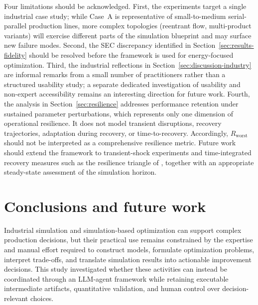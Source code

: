 \documentclass[a4paper,fleqn]{cas-sc}
\begin{document}
  Four limitations should be acknowledged. First, the experiments target a single industrial case study; while Case~A is
   representative of small-to-medium serial-parallel production lines, more complex topologies (reentrant flow,
  multi-product variants) will exercise different parts of the simulation blueprint and may surface new failure modes.  
  Second, the SEC discrepancy identified in Section~\ref{sec:results-fidelity} should be resolved before the framework
  is used for energy-focused optimization. Third, the industrial reflections in Section~\ref{sec:discussion-industry}
  are informal remarks from a small number of practitioners rather than a structured usability study; a separate
  dedicated investigation of usability and non-expert accessibility remains an interesting direction for future work.
  Fourth, the analysis in Section~\ref{sec:resilience} addresses performance retention under sustained parameter perturbations, which represents only one dimension of operational resilience. It does not model transient disruptions, recovery trajectories, adaptation during recovery, or time-to-recovery. Accordingly, $R_\mathrm{worst}$ should not be interpreted as a comprehensive resilience metric. Future work should extend the framework to transient-shock experiments and time-integrated recovery measures such as the resilience triangle of \citet{Bruneau2003}, together with an appropriate steady-state assessment of the simulation horizon.

     
  \section{Conclusions and future work}\label{sec:conclusion}

    Industrial simulation and simulation-based optimization can support complex production decisions, but their practical use remains constrained by the expertise and manual effort required to construct models, formulate optimization problems, interpret trade-offs, and translate simulation results into actionable improvement decisions. This study investigated whether these activities can instead be coordinated through an LLM-agent framework while retaining executable intermediate artifacts, quantitative validation, and human control over decision-relevant choices.
\end{document}
